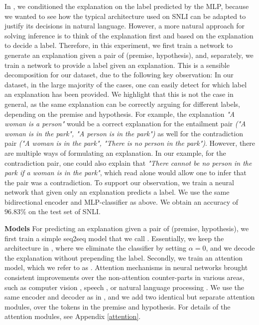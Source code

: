 In \expone, we conditioned the explanation on the label predicted by the MLP, because we wanted to see how the typical architecture used on SNLI can be adapted to justify its decisions in natural language. However, a more natural approach for solving inference is to think of the explanation first and based on the explanation to decide a label. Therefore, in this experiment, we first train a network to generate an explanation given a pair of (premise, hypothesis), and, separately, we train a network to provide a label given an explanation. This is a sensible decomposition for our dataset, due to the following key observation: In our dataset, in the large majority of the cases, one can easily detect for which label an explanation has been provided. We highlight that this is not the case in general, as the same explanation can be correctly arguing for different labels, depending on the premise and hypothesis. For example, the explanation \textit{"A woman is a person"} would be a correct explanation for the entailment pair \textit{("A woman is in the park", "A person is in the park")} as well for the contradiction pair \textit{("A woman is in the park", "There is no person in the park")}. However, there are multiple ways of formulating an explanation. In our example, for the contradiction pair, one could also explain that \textit{"There cannot be no person in the park if a woman is in the park"}, which read alone would allow one to infer that the pair was a contradiction. To support our observation, we train a neural network that given only an explanation predicts a label. We use the same bidirectional encoder and MLP-classifier as above. We obtain an accuracy of $96.83\%$ on the test set of SNLI.  


\textbf{Models   } For predicting an explanation given a pair of (premise, hypothesis), we first train a simple seq2seq model that we call \exptwoseqtoseq. Essentially, we keep the architecture in \eInferSent{}, where we eliminate the classifier by setting $\alpha=0$, and we decode the explanation without prepending the label. Secondly, we train an attention model, which we refer to as \exptwoattention. Attention mechanisms in neural networks brought consistent improvements over the non-attention counter-parts in various areas, such as computer vision \cite{showattend}, speech \cite{listenattend}, or natural language processing \cite{best-attention, BahdanauCB14}. We use the same encoder and decoder as in \exptwoseqtoseq, and we add two identical but separate attention modules, over the tokens in the premise and hypothesis. For details of the attention modules, see Appendix \ref{attention}.


